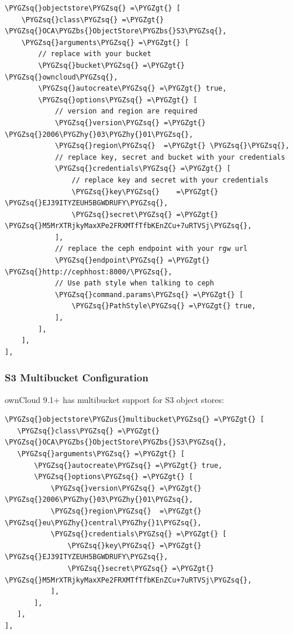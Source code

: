 \documentclass[letterpaper,10pt,english]{sphinxmanual}
\def\PYGZbs{\char`\\}
\def\PYGZus{\char`\_}
\def\PYGZgt{\char`\>}
\def\PYGZhy{\char`\-}
\def\PYGZsq{\char`\'}
\begin{document}
\begin{Verbatim}[commandchars=\\\{\}]
\PYGZsq{}objectstore\PYGZsq{} =\PYGZgt{} [
    \PYGZsq{}class\PYGZsq{} =\PYGZgt{} \PYGZsq{}OCA\PYGZbs{}ObjectStore\PYGZbs{}S3\PYGZsq{},
    \PYGZsq{}arguments\PYGZsq{} =\PYGZgt{} [
        // replace with your bucket
        \PYGZsq{}bucket\PYGZsq{} =\PYGZgt{} \PYGZsq{}owncloud\PYGZsq{},
        \PYGZsq{}autocreate\PYGZsq{} =\PYGZgt{} true,
        \PYGZsq{}options\PYGZsq{} =\PYGZgt{} [
            // version and region are required
            \PYGZsq{}version\PYGZsq{} =\PYGZgt{} \PYGZsq{}2006\PYGZhy{}03\PYGZhy{}01\PYGZsq{},
            \PYGZsq{}region\PYGZsq{}  =\PYGZgt{} \PYGZsq{}\PYGZsq{},
            // replace key, secret and bucket with your credentials
            \PYGZsq{}credentials\PYGZsq{} =\PYGZgt{} [
                // replace key and secret with your credentials
                \PYGZsq{}key\PYGZsq{}    =\PYGZgt{} \PYGZsq{}EJ39ITYZEUH5BGWDRUFY\PYGZsq{},
                \PYGZsq{}secret\PYGZsq{} =\PYGZgt{} \PYGZsq{}M5MrXTRjkyMaxXPe2FRXMTfTfbKEnZCu+7uRTVSj\PYGZsq{},
            ],
            // replace the ceph endpoint with your rgw url
            \PYGZsq{}endpoint\PYGZsq{} =\PYGZgt{} \PYGZsq{}http://cephhost:8000/\PYGZsq{},
            // Use path style when talking to ceph
            \PYGZsq{}command.params\PYGZsq{} =\PYGZgt{} [
                \PYGZsq{}PathStyle\PYGZsq{} =\PYGZgt{} true,
            ],
        ],
    ],
],
\end{Verbatim}


\subsubsection{S3 Multibucket Configuration}
\label{enterprise_external_storage/s3_swift_as_primary_object_store_configuration:s3-multibucket-configuration}
ownCloud 9.1+ has multibucket support for S3 object stores:

\begin{Verbatim}[commandchars=\\\{\}]
\PYGZsq{}objectstore\PYGZus{}multibucket\PYGZsq{} =\PYGZgt{} [
   \PYGZsq{}class\PYGZsq{} =\PYGZgt{} \PYGZsq{}OCA\PYGZbs{}ObjectStore\PYGZbs{}S3\PYGZsq{},
   \PYGZsq{}arguments\PYGZsq{} =\PYGZgt{} [
       \PYGZsq{}autocreate\PYGZsq{} =\PYGZgt{} true,
       \PYGZsq{}options\PYGZsq{} =\PYGZgt{} [
           \PYGZsq{}version\PYGZsq{} =\PYGZgt{} \PYGZsq{}2006\PYGZhy{}03\PYGZhy{}01\PYGZsq{},
           \PYGZsq{}region\PYGZsq{}  =\PYGZgt{} \PYGZsq{}eu\PYGZhy{}central\PYGZhy{}1\PYGZsq{},
           \PYGZsq{}credentials\PYGZsq{} =\PYGZgt{} [
               \PYGZsq{}key\PYGZsq{} =\PYGZgt{} \PYGZsq{}EJ39ITYZEUH5BGWDRUFY\PYGZsq{},
               \PYGZsq{}secret\PYGZsq{} =\PYGZgt{} \PYGZsq{}M5MrXTRjkyMaxXPe2FRXMTfTfbKEnZCu+7uRTVSj\PYGZsq{},
           ],
       ],
   ],
],
\end{Verbatim}
\end{document}
